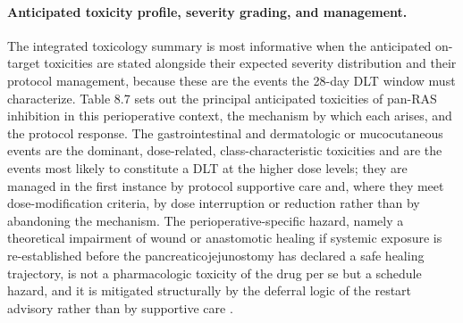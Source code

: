 \paragraph{Anticipated toxicity profile, severity grading, and management.}
The integrated toxicology summary is most informative when the anticipated
on-target toxicities are stated alongside their expected severity distribution and
their protocol management, because these are the events the 28-day DLT window must
characterize. Table 8.7 sets out the principal anticipated toxicities of pan-RAS
inhibition in this perioperative context, the mechanism by which each arises, and
the protocol response. The gastrointestinal and dermatologic or mucocutaneous
events are the dominant, dose-related, class-characteristic toxicities and are the
events most likely to constitute a DLT at the higher dose levels; they are managed
in the first instance by protocol supportive care and, where they meet
dose-modification criteria, by dose interruption or reduction rather than by
abandoning the mechanism. The perioperative-specific hazard, namely a theoretical
impairment of wound or anastomotic healing if systemic exposure is re-established
before the pancreaticojejunostomy has declared a safe healing trajectory, is not a
pharmacologic toxicity of the drug per se but a schedule hazard, and it is mitigated
structurally by the deferral logic of the restart advisory rather than by
supportive care \cite{onpremwhippl}.

